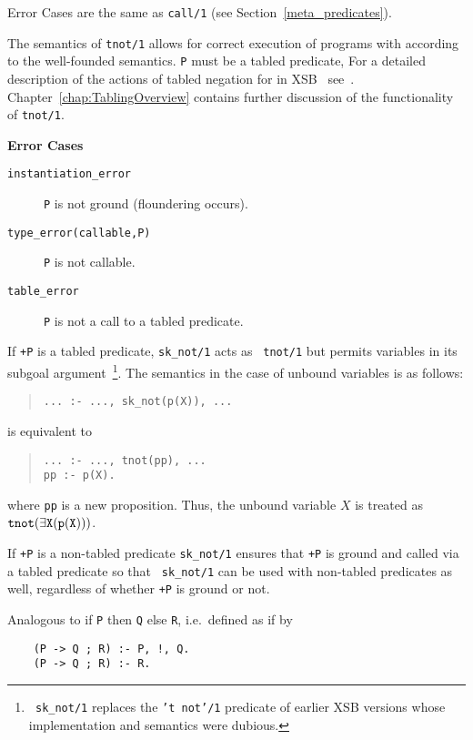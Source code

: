 \begin{description}
    Error Cases are the same as {\tt call/1} (see
    Section~\ref{meta_predicates}).

\label{tnot/1}
    The semantics of {\tt tnot/1} allows for correct execution of
    programs with according to the well-founded semantics.  {\tt P}
    must be a tabled predicate, 
%
% 
%
    For a detailed description of the actions of tabled negation for
    in XSB \version\ see~\cite{SaSw98, SaSW96}.
    Chapter~\ref{chap:TablingOverview} contains further discussion of the
    functionality of {\tt tnot/1}.

{\bf Error Cases}
    \begin{description}
    \item[{\tt instantiation\_error}]
	{\tt P} is not ground (floundering occurs).
    \item[{\tt type\_error(callable,P)}]
	{\tt P} is not callable.
    \item[{\tt table\_error}]
	{\tt P} is not a call to a tabled predicate.
    \end{description}


If {\tt +P} is a tabled predicate, {\tt sk\_not/1} acts as {\tt
  tnot/1} but permits variables in its subgoal argument~\footnote{{\tt
    sk\_not/1} replaces the {\tt 't not'/1} predicate of earlier XSB
  versions whose implementation and semantics were dubious.}. The
semantics in the case of unbound variables is as follows:
\begin{quote} 
\tt ... :- ...,~sk\_not(p(X)),~...  \end{quote} 
is equivalent to 
\begin{quote}
 \tt ... :- ..., tnot(pp),~...\\ pp :- p(X).
\end{quote} 
where {\tt pp} is a new proposition. Thus, the unbound variable $X$ is
treated as $\tt tnot(\exists X (p(X)))$.

If {\tt +P} is a non-tabled predicate {\tt sk\_not/1} ensures that
{\tt +P} is ground and called via a tabled predicate so that {\tt
  sk\_not/1} can be used with non-tabled predicates as well,
regardless of whether {\tt +P} is ground or not.

    Analogous to if {\tt P} then {\tt Q} else {\tt R}, i.e.\ defined as 
    if by
	\begin{center}
	\begin{minipage}{2.10in}
	\begin{verbatim}
	(P -> Q ; R) :- P, !, Q.
	(P -> Q ; R) :- R.
	\end{verbatim}
	\end{minipage}
	\end{center}


\end{description}

